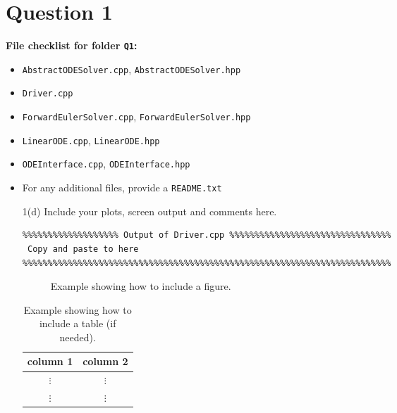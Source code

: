 \documentclass[a4,10pt,fleqn]{article}  %
\newcommand{\il}[1]{\texttt{#1}}
\begin{document}
\clearpage

\section*{Question 1}

\textbf{File checklist for folder \il{Q1}:}
\begin{itemize}
 \item \il{AbstractODESolver.cpp}, \il{AbstractODESolver.hpp}
 \item \il{Driver.cpp}
 \item \il{ForwardEulerSolver.cpp}, \il{ForwardEulerSolver.hpp}
 \item \il{LinearODE.cpp}, \il{LinearODE.hpp}
 \item \il{ODEInterface.cpp}, \il{ODEInterface.hpp}
 \item For any additional files, provide a \il{README.txt}
\end{itemize}

\vspace{10mm}
\begin{itemize}

\item[1(d)] Include your plots, screen output and comments here.

\begin{verbatim}
%%%%%%%%%%%%%%%%%%% Output of Driver.cpp %%%%%%%%%%%%%%%%%%%%%%%%%%%%%%%%
 Copy and paste to here
%%%%%%%%%%%%%%%%%%%%%%%%%%%%%%%%%%%%%%%%%%%%%%%%%%%%%%%%%%%%%%%%%%%%%%%%%
\end{verbatim}

  \begin{figure}[htbp]
   \caption{Example showing how to include a figure.}
   \label{figure1a_label}
  \end{figure}

  \begin{table}[htbp]
   \begin{center}
    \begin{tabular}{c|c}
     column 1 & column 2 \\ \hline
     $\vdots$  & $\vdots$  \\
     $\vdots$  & $\vdots$
    \end{tabular}
   \end{center}
   \caption{Example showing how to include a table (if needed).}
   \label{table1d_label}
  \end{table}

\end{itemize}
\end{document}
